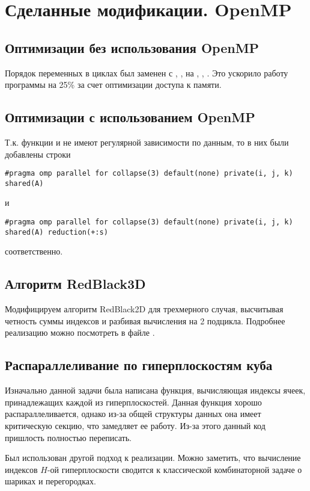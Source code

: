 \section{Сделанные модификации. OpenMP}


\subsection{Оптимизации без использования OpenMP}
Порядок переменных в циклах был заменен с , ,  на , , . Это ускорило работу программы на 25\% за счет оптимизации доступа к памяти.

\subsection{Оптимизации с использованием OpenMP}
Т.к. функции  и  не имеют регулярной зависимости по данным, то в них были добавлены строки
\begin{lstlisting}
#pragma omp parallel for collapse(3) default(none) private(i, j, k) shared(A)
\end{lstlisting}
и
\begin{lstlisting}
#pragma omp parallel for collapse(3) default(none) private(i, j, k) shared(A) reduction(+:s)
\end{lstlisting}
соответственно.

\subsection{Алгоритм RedBlack3D}
Модифицируем алгоритм RedBlack2D для трехмерного случая, высчитывая четность суммы индексов  и разбивая вычисления на 2 подцикла. Подробнее реализацию можно посмотреть в файле .

\subsection{Распараллеливание по гиперплоскостям куба}
Изначально данной задачи была написана функция, вычисляющая индексы ячеек, принадлежащих каждой из гиперплоскостей. Данная функция хорошо распараллеливается, однако из-за общей структуры данных она имеет критическую секцию, что замедляет ее работу. Из-за этого данный код пришлость полностью переписать.

Был использован другой подход к реализации. Можно заметить, что вычисление индексов $H$-ой гиперплоскости сводится к классической комбинаторной задаче о шариках и перегородках.

